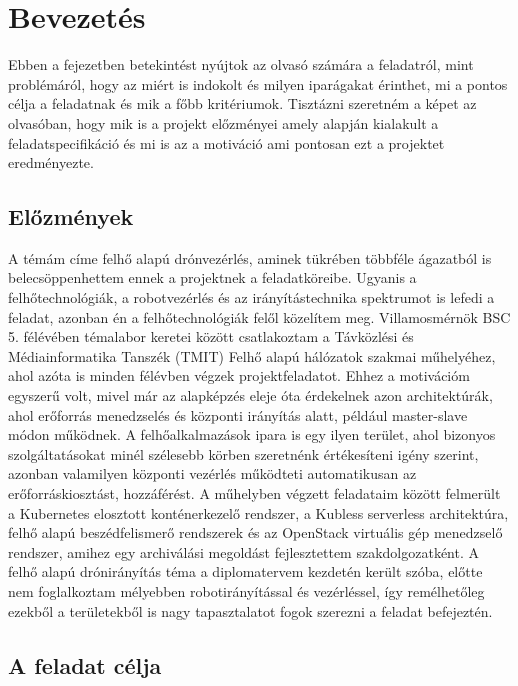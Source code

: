 \chapter{Bevezetés}

Ebben a fejezetben betekintést nyújtok az olvasó számára a feladatról, mint problémáról, hogy az miért is indokolt és milyen iparágakat érinthet, mi a pontos célja a feladatnak és mik a főbb kritériumok. Tisztázni szeretném a képet az olvasóban, hogy mik is a projekt előzményei amely alapján kialakult a feladatspecifikáció és mi is az a motiváció ami pontosan ezt a projektet eredményezte.

\section{Előzmények}

A témám címe felhő alapú drónvezérlés, aminek tükrében többféle ágazatból is belecsöppenhettem ennek a projektnek a feladatköreibe. Ugyanis a felhőtechnológiák, a robotvezérlés és az irányítástechnika spektrumot is lefedi a feladat, azonban én a felhőtechnológiák felől közelítem meg. Villamosmérnök BSC 5. félévében témalabor keretei között csatlakoztam a Távközlési és Médiainformatika Tanszék (TMIT) Felhő alapú hálózatok szakmai műhelyéhez, ahol azóta is minden félévben végzek projektfeladatot. Ehhez a motivációm egyszerű volt, mivel már az alapképzés eleje óta érdekelnek azon architektúrák, ahol erőforrás menedzselés és központi irányítás alatt, például master-slave módon működnek. A felhőalkalmazások ipara is egy ilyen terület, ahol bizonyos szolgáltatásokat minél szélesebb körben szeretnénk értékesíteni igény szerint, azonban valamilyen központi vezérlés működteti automatikusan az erőforráskiosztást, hozzáférést. A műhelyben végzett feladataim között felmerült a Kubernetes elosztott konténerkezelő rendszer, a Kubless serverless architektúra, felhő alapú beszédfelismerő rendszerek és az OpenStack virtuális gép menedzselő rendszer, amihez egy archiválási megoldást fejlesztettem szakdolgozatként. A felhő alapú drónirányítás téma a diplomatervem kezdetén került szóba, előtte nem foglalkoztam mélyebben robotirányítással és vezérléssel, így remélhetőleg ezekből a területekből is nagy tapasztalatot fogok szerezni a feladat befejeztén.

\section{A feladat célja}


